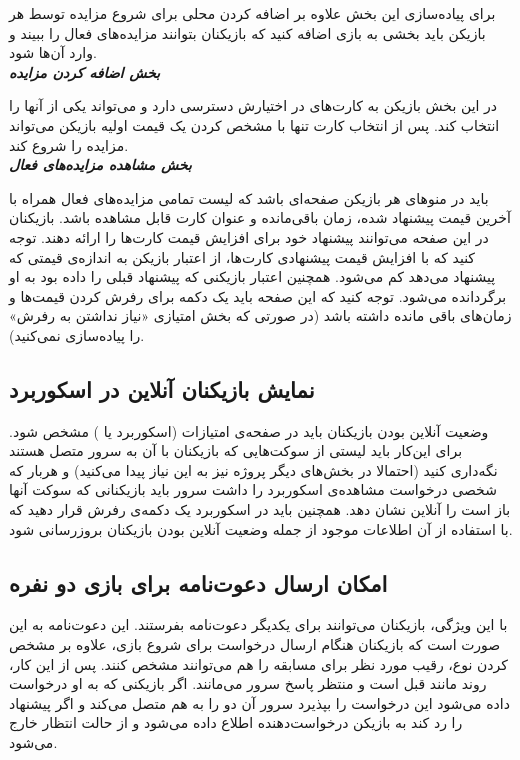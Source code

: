 \documentclass[]{article}
\begin{document}
برای پیاده‌سازی این بخش علاوه بر اضافه کردن محلی برای شروع مزایده توسط هر بازیکن باید بخشی به بازی اضافه کنید که بازیکنان بتوانند مزایده‌های فعال را ببیند و وارد آن‌ها شود.
\\

\textbf{\emph{ بخش اضافه کردن مزایده }}

در این بخش بازیکن به کارت‌های در اختیارش دسترسی دارد و می‌تواند یکی از آنها را انتخاب کند. پس از انتخاب کارت تنها با مشخص کردن یک قیمت اولیه بازیکن می‌تواند مزایده را شروع کند.
\\

\textbf{\emph{ بخش مشاهده مزایده‌های فعال }}

باید در منو‌های هر بازیکن صفحه‌ای باشد که لیست تمامی مزایده‌های فعال همراه با آخرین قیمت پیشنهاد شده، زمان باقی‌مانده و عنوان کارت قابل مشاهده باشد. بازیکنان در این صفحه می‌توانند پیشنهاد خود برای افزایش قیمت کارت‌ها را ارائه دهند. توجه کنید که با افزایش قیمت پیشنهادی کارت‌ها، از اعتبار بازیکن به اندازه‌ی قیمتی که پیشنهاد می‌دهد کم می‌شود. همچنین اعتبار بازیکنی که پیشنهاد قبلی را داده بود به او برگردانده می‌شود. توجه کنید که این صفحه باید یک دکمه برای رفرش کردن قیمت‌ها و زمان‌های باقی مانده داشته باشد (در صورتی که بخش امتیازی «نیاز نداشتن به رفرش» را پیاده‌سازی نمی‌کنید).

\subsection*{{\titr نمایش بازیکنان آنلاین در اسکوربرد}}

وضعیت آنلاین بودن بازیکنان باید در صفحه‌ی امتیازات (اسکوربرد یا ) مشخص شود. برای این‌کار باید لیستی از سوکت‌هایی که بازیکنان با آن به سرور متصل هستند نگه‌داری کنید (احتمالا در بخش‌های دیگر پروژه نیز به این نیاز پیدا می‌کنید) و هربار که شخصی درخواست مشاهده‌ی اسکوربرد را داشت سرور باید بازیکنانی که سوکت‌ آنها باز است را آنلاین نشان دهد. همچنین باید در اسکوربرد یک دکمه‌ی رفرش قرار دهید که با استفاده از آن اطلاعات موجود از جمله وضعیت آنلاین بودن بازیکنان بروزرسانی شود.

\subsection*{{\titr امکان ارسال دعوت‌نامه برای بازی دو نفره}}

با این ویژگی، بازیکنان می‌توانند برای یکدیگر دعوت‌نامه بفرستند. این دعوت‌نامه به این صورت است که بازیکنان هنگام ارسال درخواست برای شروع بازی، علاوه بر مشخص کردن نوع، رقیب مورد نظر برای مسابقه را هم می‌توانند مشخص کنند. پس از این کار، روند مانند قبل است و منتظر پاسخ سرور می‌مانند. اگر بازیکنی که به او درخواست داده می‌شود این درخواست را بپذیرد سرور آن دو را به هم متصل می‌کند و اگر پیشنهاد را رد کند به بازیکن درخواست‌دهنده اطلاع داده می‌شود و از حالت انتظار خارج می‌شود.
\end{document}
